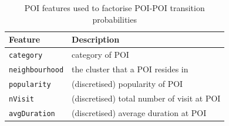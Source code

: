 \begin{table}[t]
\caption{POI features used to factorise POI-POI transition probabilities}
\label{tab:featuretran}
\centering
\setlength{\tabcolsep}{2pt} %
\begin{tabular}{l|l} \hline
\textbf{Feature}       & \textbf{Description} \\ \hline
\texttt{category}      & category of POI \\
\texttt{neighbourhood} & the cluster that a POI resides in \\
\texttt{popularity}    & (discretised) popularity of POI \\
\texttt{nVisit}        & (discretised) total number of visit at POI \\
\texttt{avgDuration}   & (discretised) average duration at POI \\ \hline
\end{tabular}
\end{table}


